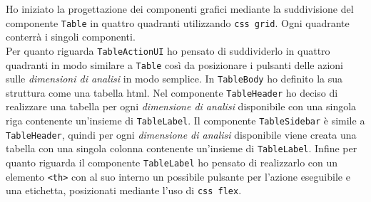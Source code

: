 \noindent
Ho iniziato la progettazione dei componenti grafici mediante la suddivisione del componente \verb|Table| in quattro quadranti utilizzando \verb|css grid|. Ogni quadrante conterrà i singoli componenti. \\
Per quanto riguarda \verb|TableActionUI| ho pensato di suddividerlo in quattro quadranti in modo similare a \verb|Table| così da posizionare i pulsanti delle azioni sulle \emph{dimensioni di analisi} in modo semplice.
In \verb|TableBody| ho definito la sua struttura come una tabella html.
Nel componente \verb|TableHeader| ho deciso di realizzare una tabella per ogni \emph{dimensione di analisi} disponibile con una singola riga contenente un'insieme di \verb|TableLabel|.
Il componente \verb|TableSidebar| è simile a \verb|TableHeader|, quindi per ogni \emph{dimensione di analisi} disponibile viene creata una tabella con una singola colonna contenente un'insieme di \verb|TableLabel|.
Infine per quanto riguarda il componente \verb|TableLabel| ho pensato di realizzarlo con un elemento \verb|<th>| con al suo interno un possibile pulsante per l'azione eseguibile e una etichetta, posizionati mediante l'uso di \verb|css flex|.














